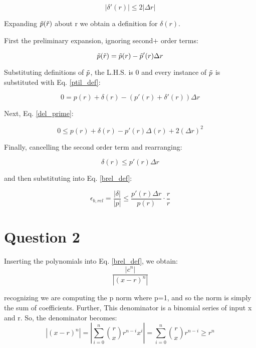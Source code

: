 \documentclass{article}
\begin{document}
\begin{equation}
    \left| \delta'(r)\right| \leq 2\left| \Delta r \right|
    \label{del_prime}
\end{equation}

Expanding $\Tilde{p}(\Tilde{r})$ about r we obtain a definition for $\delta(r)$. 

First the preliminary expansion, ignoring second$+$ order terms:

\begin{equation}
    \Tilde{p}(\Tilde{r}) = \Tilde{p}(r) - \Tilde{p}'(r)\Delta r
\end{equation}

Substituting definitions of $\Tilde{p}$, the  L.H.S. is 0 and every instance of $\Tilde{p}$ is substituted with Eq. \ref{ptil_def}:

\begin{equation}
    0 = p(r) + \delta(r) - (p'(r)+\delta'(r))\Delta r 
\end{equation}

Next, Eq. \ref{del_prime}:

\begin{equation}
    0 \leq p(r) + \delta(r) - p'(r)\Delta(r)+2(\Delta r)^2
\end{equation}

Finally, cancelling the second order term and rearranging:

\begin{equation}
    \delta (r) \leq p'(r)\Delta r
\end{equation}

and then substituting into Eq. \ref{brel_def}:

\begin{equation}
    \epsilon_{b,rel} = \frac{\left| \delta \right|}{|p|} \leq \frac{p'(r)\Delta r}{p(r)} \cdot\frac{r}{r}
\end{equation}

\newpage


\section*{Question 2}

Inserting the polynomials into Eq. \ref{brel_def}, we obtain:
\begin{equation}
    \frac{|c^n|}{|(x-r)^n|}
    \label{q2_be}
\end{equation}

recognizing we are computing the p norm where p=1, and so the norm is simply the sum of coefficients. Further, This denominator is a binomial series of input x and r. So, the denominator becomes:
\begin{equation}
    |(x-r)^n| = \left|\sum_{i=0}^n {{r\choose x}r^{n-i}x^i} \right| = \sum_{i=0}^n {{r\choose x}r^{n-i}} \geq r^n
\end{equation}
\end{document}
